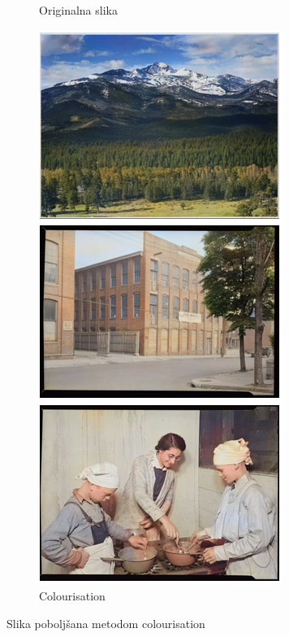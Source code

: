 \begin{enumerate}
\begin{figure}[htb]
\begin{subfigure}[b]{0.4\linewidth}
		\caption{Originalna slika}
	\end{subfigure}
	\begin{subfigure}[b]{0.4\linewidth}
		\includegraphics[width=\linewidth]{img/Colourisation.png}
		\caption{Colourisation}
	\end{subfigure}
	\caption{Slika poboljšana metodom colourisation}
	\label{img:colourisation}
\end{figure}

\end{enumerate}

